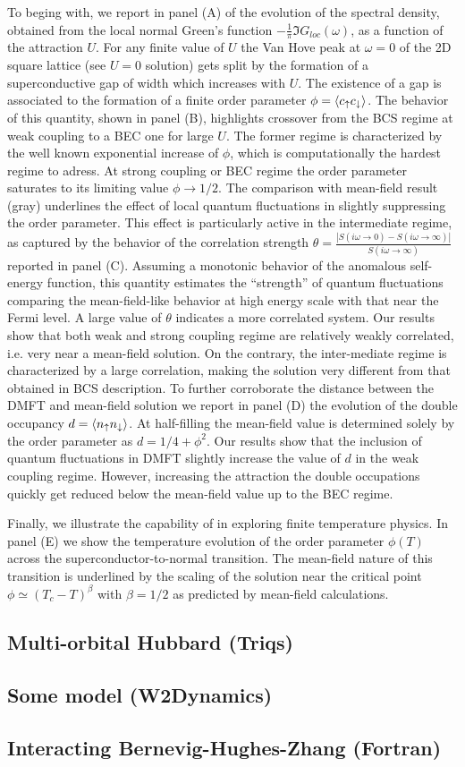 \documentclass[edipack2.tex]{subfiles}
\begin{document}
To beging with, we report in  panel (A) of  the
evolution of the spectral density, obtained from the local normal
Green's function $-\tfrac{1}{\pi}\Im{G}_{loc}(\omega)$, as a function
of the attraction $U$. For any finite value of  $U$ the Van Hove peak
at $\omega=0$ of the 2D square lattice (see $U=0$
solution) gets split by the formation of a superconductive gap of
width which increases with $U$.
The existence of a gap is associated to the formation of a finite
order parameter $\phi=\langle c_\uparrow c_\downarrow\rangle$. The behavior of
this quantity, shown in panel (B), highlights crossover from the BCS
regime at weak coupling to a BEC one for large $U$.
The former regime is characterized by the well known exponential increase of
$\phi$, which is computationally the hardest regime to adress. At
strong coupling or BEC regime the order parameter saturates to its
limiting value $\phi\to 1/2$. The comparison with mean-field result
(gray) underlines the effect of local quantum fluctuations in slightly
suppressing the order parameter. This effect is particularly active in
the intermediate regime, as captured by the behavior of the
correlation strength
$\theta=\frac{|S(i\omega\to 0)-S(i\omega\to\infty)|}{S(i\omega\to\infty)}$
reported in panel (C). Assuming a monotonic behavior of the anomalous
self-energy function, this quantity estimates the ``strength'' of
quantum fluctuations comparing the mean-field-like behavior at high
energy scale with that near the Fermi level. A large value of $\theta$
indicates a more correlated system.
Our results show that both weak and strong coupling regime are
relatively weakly correlated, i.e. very near a mean-field solution. On
the contrary, the inter-mediate regime is characterized by a large
correlation, making the solution very different from that obtained in
BCS description.  
To further corroborate the distance between the DMFT and mean-field
solution we report in panel (D) the evolution of the double occupancy
$d=\langle n_\uparrow n_\downarrow\rangle$. At half-filling the mean-field value is
determined solely by the order parameter as $d=1/4 + \phi^2$.
Our results show that the inclusion of quantum fluctuations in DMFT
slightly increase the value of $d$ in the weak coupling
regime. However, increasing the attraction the double occupations
quickly get reduced below the mean-field value up to the BEC regime.

Finally, we illustrate the capability of \NAME in
exploring finite temperature physics. In panel (E) we show the
temperature evolution of the order parameter $\phi(T)$ across the
superconductor-to-normal transition. The mean-field nature of this
transition is underlined by the scaling of  the solution near
the critical point $\phi \simeq (T_c-T)^\beta$ with $\beta=1/2$ as
predicted by mean-field calculations. 





\subsection{Multi-orbital Hubbard (Triqs)}

\subsection{Some model (W2Dynamics)}

\subsection{Interacting Bernevig-Hughes-Zhang (Fortran)}
\end{document}
